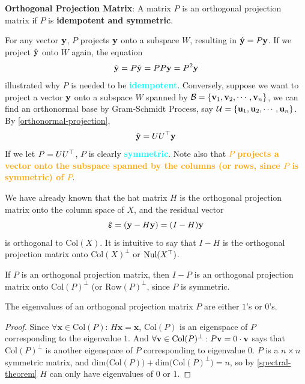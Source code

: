 \begin{Def}
    \textbf{Orthogonal Projection Matrix}: A matrix $P$ is an orthogonal projection matrix if $P$ is \textbf{idempotent and symmetric}.
    \begin{Rem}
    For any vector $\mathbf{y}$, $P$ projects $\mathbf{y}$ onto a subspace $W$, resulting in $\Hat{\mathbf{y}} = P\mathbf{y}$. If we project $\Hat{\mathbf{y}}$ onto $W$ again, the equation
    \begin{equation}
        \Hat{\mathbf{y}} = P\Hat{\mathbf{y}} = PP\mathbf{y} = P^2\mathbf{y}
    \end{equation} illustrated why $P$ is needed to be \textbf{\textcolor{cyan}{idempotent}}. Conversely, suppose we want to project a vector $\mathbf{y}$ onto a subspace $W$ spanned by $\mathcal{B} = \{\mathbf{v}_1, \mathbf{v}_2,\cdots, \mathbf{v}_n \}$, we can find an orthonormal base by Gram-Schmidt Process, say $\mathcal{U} = \{\mathbf{u}_1, \mathbf{u}_2, \cdots, \mathbf{u}_n\}$. By \cref{orthonormal-projection}, 
    \begin{equation*}
        \hat{\mathbf{y}} = UU^{\top}\mathbf{y}
    \end{equation*}
    If we let $P = UU^{\top}$, $P$ is clearly \textbf{\textcolor{cyan}{symmetric}}. Note also that \textbf{\textcolor{orange}{$P$ projects a vector onto the subspace spanned by the columns (or rows, since $P$ is symmetric) of $P$}}.
    \end{Rem}
\end{Def}
    We have already known that the hat matrix $H$ is the orthogonal projection matrix onto the column space of $X$, and the residual vector
    \begin{equation*}
        \hat{\pmb{\varepsilon}} = (\mathbf{y} - H\mathbf{y}) = (I - H)\mathbf{y}
    \end{equation*}
    is orthogonal to $\text{Col}(X)$. It is intuitive to say that $I - H$ is the orthogonal projection matrix onto $\text{Col}(X)^\perp$ or $\text{Nul}(X^{\top})$. 
    \begin{Thm}
        If $P$ is an orthogonal projection matrix, then $I - P$ is an orthogonal projection matrix onto $\text{Col}(P)^\perp$ (or $\text{Row}(P)^\perp$, since $P$ is symmetric.
    \end{Thm}
    \begin{Thm}\label{0-1-eigen}
        The eigenvalues of an orthogonal projection matrix $P$  are either $1$'s or $0$'s.
        \begin{proof}
            Since $\forall\mathbf{x}\in\text{Col}(P)$: $H\mathbf{x} = \mathbf{x}$, $\text{Col}(P)$ is an eigenspace of $P$ corresponding to the eigenvalue $1$. And $\forall \mathbf{v}\in \text{Col}(P)^\perp: P\mathbf{v} = 0\cdot \mathbf{v}$ says that $\text{Col}(P)^\perp$ is another eigenspace of $P$ corresponding to eigenvalue $0$. $P$ is a $n\times n$ symmetric matrix, and $\text{dim}\Big(\text{Col}(P)\Big) + \text{dim}\Big(\text{Col}(P)^\perp\Big) = n$, so by \cref{spectral-theorem} $H$ can only have eigenvalues of $0$ or $1$.
        \end{proof}
    \end{Thm}
